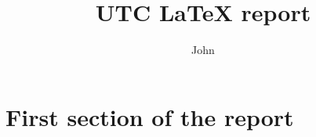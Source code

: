 \documentclass{utc-report}
\title{UTC LaTeX report}
\author{John \\\sc{DOE}}
\begin{document}
\maketitlepage

\tableofcontents{}

\pagebreak

\section{First section of the report}
\end{document}
